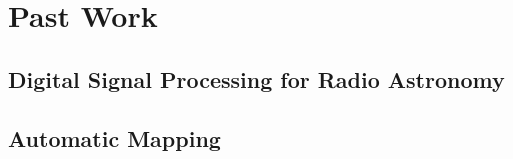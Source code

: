 \chapter{Past Work}

\section{Digital Signal Processing for Radio Astronomy}
\section{Automatic Mapping}


